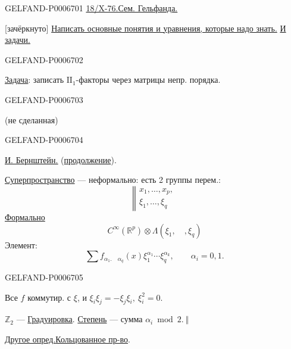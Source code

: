 \begin{GelfandAdjacentEvidence}{GELFAND-P000670}{1}
\underline{18/X-76.}\quad\underline{Сем. Гельфанда.}

[зачёркнуто] \underline{Написать основные понятия и уравнения, которые надо знать.} \underline{И задачи.}
\end{GelfandAdjacentEvidence}
\begin{GelfandAdjacentEvidence}{GELFAND-P000670}{2}


\underline{\underline{Задача}}: записать \(\mathrm{II}_1\)-факторы через матрицы непр. порядка.
\end{GelfandAdjacentEvidence}
\begin{GelfandAdjacentEvidence}{GELFAND-P000670}{3}


(не сделанная)
\end{GelfandAdjacentEvidence}
\begin{GelfandAdjacentEvidence}{GELFAND-P000670}{4}


\underline{\underline{И. Бернштейн.}} (\underline{продолжение}).

\underline{Суперпространство} --- неформально: есть 2 группы перем.:
\[
\left\Vert\begin{array}{l}
x_1,\ldots,x_p,\\
\xi_1,\ldots,\xi_q
\end{array}\right.
\]
\underline{Формально}
\[
C^\infty(\mathbb R^p)\otimes\Lambda(\xi_1,\quad,\xi_q)
\]
Элемент:
\[
\sum f_{\alpha_1.\quad\alpha_q}(x)\xi_1^{\alpha_1}\cdots\xi_q^{\alpha_k},
\qquad \alpha_i=0,1.
\]
\end{GelfandAdjacentEvidence}
\begin{GelfandAdjacentEvidence}{GELFAND-P000670}{5}


Все \(f\) коммутир. с \(\xi\), и
\(\xi_i\xi_j=-\xi_j\xi_i,\ \xi_i^2=0\).

\(\mathbb Z_2\) --- \underline{Градуировка}.\qquad
\underline{Степень} --- сумма \(\alpha_i\bmod 2.\ \Vert\)

\underline{\underline{Другое опред.}}\qquad
[зачёркнуто] \underline{Кольцованное пр-во}.
\end{GelfandAdjacentEvidence}
